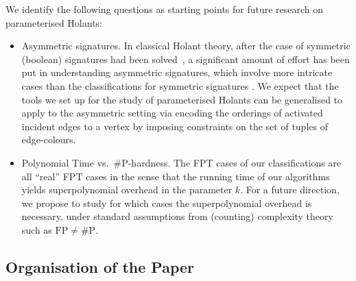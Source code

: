 \documentclass[authorcolumns,numberwithinsect]{no-lipics-v2022}
\begin{document}
We identify the following questions as starting points for future research on parameterised Holants:
\begin{itemize}
    \item Asymmetric signatures. In classical Holant theory, after the case of symmetric (boolean) signatures had been solved~\cite{CaiGW16}, a significant amount of effort has been put in understanding asymmetric signatures, which involve more intricate cases than the classifications for symmetric signatures \cite{CaiFX18,CaiF23,meng2025}. We expect that the tools we set up for the study of parameterised Holants can be generalised to apply to the asymmetric setting via encoding the orderings of activated incident edges to a vertex by imposing  constraints on the set of tuples of edge-colours.
    \item Polynomial Time vs.\ $\#\mathrm{P}$-hardness. The FPT cases of our classifications are all ``real'' FPT cases in the sense that the running time of our algorithms yields superpolynomial overhead in the parameter $k$. For a future direction, we propose to study for which cases the superpolynomial overhead is necessary, under standard assumptions from (counting) complexity theory such as $\mathrm{FP}\neq \#\mathrm{P}$.
\end{itemize}


\subsection{Organisation of the Paper}
\end{document}
